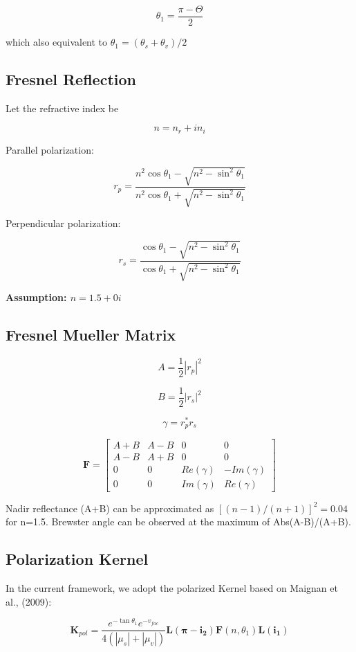 \documentclass[
  letterpaper,
  open=any]{scrbook}
\begin{document}
\[
\theta_1 =\frac{\pi - \Theta}{2}
\]

which also equivalent to \(\theta_1=(\theta_s+\theta_v)/2\)

\subsection{Fresnel Reflection}\label{fresnel-reflection}

Let the refractive index be

\[
n = n_r + i n_i
\]

Parallel polarization:

\[
r_p =
\frac{n^2\cos\theta_1 - \sqrt{n^2-\sin^2\theta_1}}
{n^2\cos\theta_1 + \sqrt{n^2-\sin^2\theta_1}}
\]

Perpendicular polarization:

\[
r_s =
\frac{\cos\theta_1 - \sqrt{n^2-\sin^2\theta_1}}
{\cos\theta_1 + \sqrt{n^2-\sin^2\theta_1}}
\]

\textbf{Assumption: \(n = 1.5 + 0i\) }

\subsection{Fresnel Mueller Matrix}\label{fresnel-mueller-matrix}

\[
A = \frac{1}{2}|r_p|^2
\]

\[
B = \frac{1}{2}|r_s|^2
\]

\[
\gamma = r_p^* r_s
\]

\[
\mathbf{F} =
\begin{bmatrix}
A+B & A-B & 0 & 0 \\
A-B & A+B & 0 & 0 \\
0 & 0 & Re(\gamma) & -Im(\gamma) \\
0 & 0 & Im(\gamma) & Re(\gamma)
\end{bmatrix}
\]

Nadir reflectance (A+B) can be approximated as \([(n-1)/(n+1)]^2=0.04\)
for n=1.5. Brewster angle can be observed at the maximum of
Abs(A-B)/(A+B).

\subsection{Polarization Kernel}\label{polarization-kernel}

In the current framework, we adopt the polarized Kernel based on Maignan
et al., (2009):

\[
\mathbf{K}_{pol} =
\frac{
e^{-\tan\theta_1}e^{-v_{fac}}
}{4(|\mu_s|+|\mu_v|)}
\mathbf{L(\pi-i_2)}\mathbf{F} (n, \theta_1) \mathbf{L(i_1)}
\]
\end{document}
